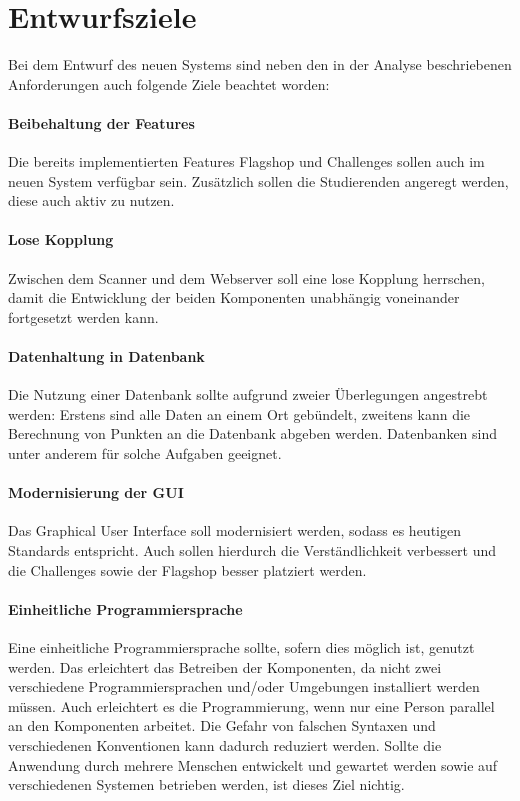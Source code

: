 \section{Entwurfsziele} \label{sec:Entwurfsziele}

Bei dem Entwurf des neuen Systems sind neben den in der Analyse beschriebenen Anforderungen auch folgende Ziele beachtet worden:

\paragraph{Beibehaltung der Features}
Die bereits implementierten Features Flagshop und Challenges sollen auch im neuen System verfügbar sein. Zusätzlich sollen die Studierenden angeregt werden, diese auch aktiv zu nutzen.

\paragraph{Lose Kopplung}
Zwischen dem Scanner und dem Webserver soll eine lose Kopplung herrschen, damit die Entwicklung der beiden Komponenten unabhängig voneinander fortgesetzt werden kann.

\paragraph{Datenhaltung in Datenbank}
Die Nutzung einer Datenbank sollte aufgrund zweier Überlegungen angestrebt werden: Erstens sind alle Daten an einem Ort gebündelt, zweitens kann die Berechnung von Punkten an die Datenbank abgeben werden. Datenbanken sind unter anderem für solche Aufgaben geeignet.

\paragraph{Modernisierung der GUI}
Das Graphical User Interface soll modernisiert werden, sodass es heutigen Standards entspricht. Auch sollen hierdurch die Verständlichkeit verbessert und die Challenges sowie der Flagshop besser platziert werden.

\paragraph{Einheitliche Programmiersprache}
Eine einheitliche Programmiersprache sollte, sofern dies möglich ist, genutzt werden. Das erleichtert das Betreiben der Komponenten, da nicht zwei verschiedene Programmiersprachen und/oder Umgebungen installiert werden müssen. Auch erleichtert es die Programmierung, wenn nur eine Person parallel an den Komponenten arbeitet. Die Gefahr von falschen Syntaxen und verschiedenen Konventionen kann dadurch reduziert werden. Sollte die Anwendung durch mehrere Menschen entwickelt und gewartet werden sowie auf verschiedenen Systemen betrieben werden, ist dieses Ziel nichtig.

